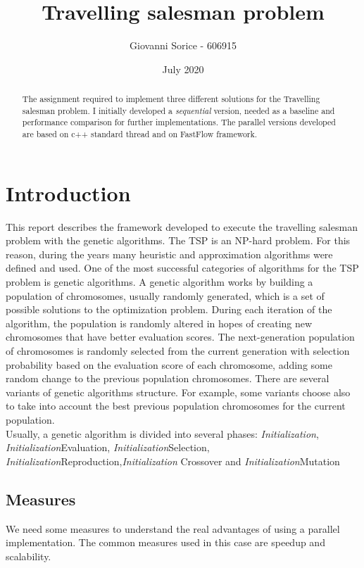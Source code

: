 \documentclass[a4paper,10pt]{article}
\title{Travelling salesman problem}
\author{Giovanni Sorice - 606915}
\date{July 2020}
\begin{document}
	

		\maketitle
		\begin{abstract}
			The assignment required to implement three different solutions for the Travelling salesman problem. I initially developed a \textit{sequential} version, needed as a baseline and performance comparison for further implementations. The parallel versions developed are based on c++ standard thread and on FastFlow framework.
		\end{abstract}

	
	\section{Introduction}
	This report describes the framework developed to execute the travelling salesman problem with the genetic algorithms.
	The TSP is an NP-hard problem. For this reason, during the years many heuristic and approximation algorithms were defined and used. One of the most successful categories of algorithms for the TSP problem is genetic algorithms.
	A genetic algorithm works by building a population of chromosomes, usually randomly generated, which is a set of possible solutions to the optimization problem. During each iteration of the algorithm, the population is randomly altered in hopes of creating new chromosomes that have better evaluation scores. The next-generation population of chromosomes is randomly selected from the current generation with selection probability based on the evaluation score of each chromosome, adding some random change to the previous population chromosomes. There are several variants of genetic algorithms structure. For example, some variants choose also to take into account the best previous population chromosomes for the current population.
	\\
	Usually, a genetic algorithm is divided into several phases: \textit{Initialization}, \textit{Initialization}Evaluation, \textit{Initialization}Selection, \textit{Initialization}Reproduction,\textit{Initialization} Crossover and \textit{Initialization}Mutation


	\subsection{Measures}
	We need some measures to understand the real advantages of using a parallel implementation. The common measures used in this case are speedup and scalability.
\end{document}
